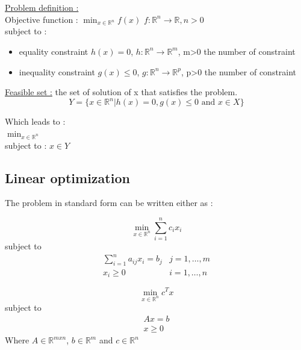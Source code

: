\documentclass[../main.tex]{subfiles}
\begin{document}
\quad \underline{Problem definition :}\\
Objective function : $\min_{x\in \mathbb{R}^n} f(x)$ $f:\mathbb{R}^n\rightarrow \mathbb{R}, n>0$\\
subject to : \begin{itemize}
    \item equality constraint $h(x)=0$, $h: \mathbb{R}^n \rightarrow \mathbb{R}^m$, m>0 the number of constraint\\
    \item inequality constraint $g(x) \leq 0$, $g: \mathbb{R}^n \rightarrow \mathbb{R}^p$, p>0 the number of constraint
\end{itemize}

\quad \underline{Feasible set :} the set of solution of x that satisfies the problem. \\
\begin{equation}
    Y = \{ x\in \mathbb{R}^n | h(x)=0, g(x)\leq 0 \text{ and } x\in X\}
\end{equation}

Which leads to :\\
$\min_{x\in \mathbb{R}^n}$\\
subject to : $x\in Y$\\

\subsection{Linear optimization}

The problem in standard form can be written either as : \\
\begin{minipage}{.5\textwidth}
    \begin{equation}
        \min_{x\in \mathbb{R}^n} \sum_{i=1}^n c_ix_i
    \end{equation}
    subject to \begin{equation}
        \begin{split}
            \sum_{i=1}^n a_{ij}x_i = b_j & j=1,\dots, m\\
            x_i \geq 0 & i=1,\dots, n
        \end{split}
    \end{equation}
\end{minipage}
\vline
\begin{minipage}{.5\textwidth}
    \begin{equation}
        \min_{x\in \mathbb{R}^n} c^T x
    \end{equation}
    subject to \begin{equation}
        \begin{split}
            Ax=b\\
            x\geq 0
        \end{split}
    \end{equation}
    Where $A \in \mathbb{R}^{mxn}$, $b\in \mathbb{R}^m$ and $c\in \mathbb{R}^n$
\end{minipage}
\end{document}
